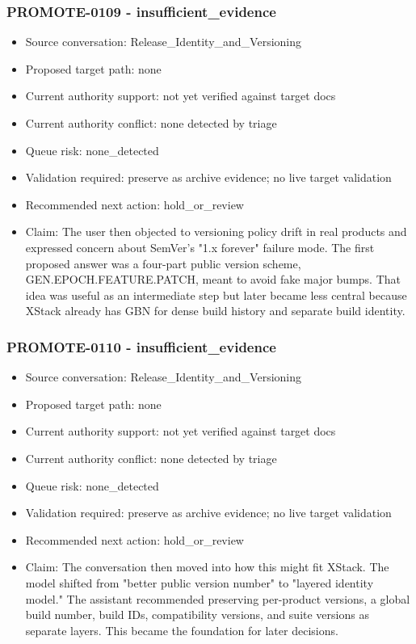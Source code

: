 \documentclass[11pt,a4paper]{report}
\begin{document}
\subsubsection{PROMOTE-0109 - insufficient\_evidence}

\begin{itemize}
\item Source conversation: Release\_Identity\_and\_Versioning
\item Proposed target path: none
\item Current authority support: not yet verified against target docs
\item Current authority conflict: none detected by triage
\item Queue risk: none\_detected
\item Validation required: preserve as archive evidence; no live target validation
\item Recommended next action: hold\_or\_review
\item Claim: The user then objected to versioning policy drift in real products and expressed concern about SemVer's "1.x forever" failure mode. The first proposed answer was a four-part public version scheme, GEN.EPOCH.FEATURE.PATCH, meant to avoid fake major bumps. That idea was useful as an intermediate step but later became less central because XStack already has GBN for dense build history and separate build identity.
\end{itemize}

\subsubsection{PROMOTE-0110 - insufficient\_evidence}

\begin{itemize}
\item Source conversation: Release\_Identity\_and\_Versioning
\item Proposed target path: none
\item Current authority support: not yet verified against target docs
\item Current authority conflict: none detected by triage
\item Queue risk: none\_detected
\item Validation required: preserve as archive evidence; no live target validation
\item Recommended next action: hold\_or\_review
\item Claim: The conversation then moved into how this might fit XStack. The model shifted from "better public version number" to "layered identity model." The assistant recommended preserving per-product versions, a global build number, build IDs, compatibility versions, and suite versions as separate layers. This became the foundation for later decisions.
\end{itemize}
\end{document}
